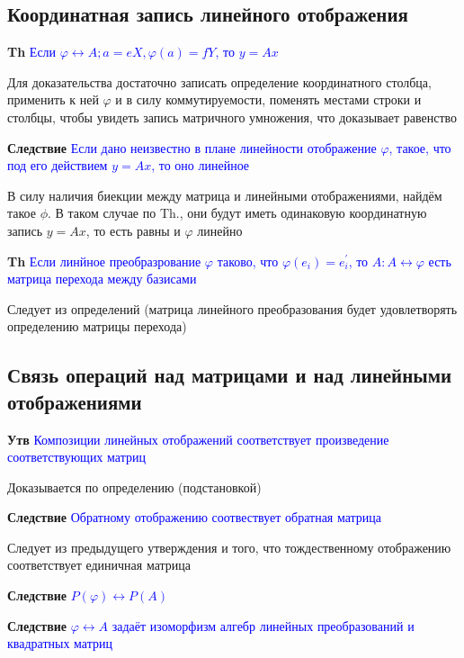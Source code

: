 \documentclass[a4paper, 14pt]{article}
\begin{document}
      \subsection{Координатная запись линейного отображения}

    \textbf{Th} \textcolor{blue}{Если $\varphi \leftrightarrow A; a = eX, \varphi(a) = fY$, то $y = Ax$}

    Для доказательства достаточно записать определение координатного столбца, применить к ней $\varphi$ и в силу
    коммутируемости, поменять местами строки и столбцы, чтобы увидеть запись матричного умножения, что доказывает
    равенство

    \textbf{Следствие} \textcolor{blue}{Если дано неизвестно в плане линейности отображение $\varphi$, такое, что под
    его действием $y = Ax$, то оно линейное}

    В силу наличия биекции между матрица и линейными отображениями, найдём такое $\phi$.
    В таком случае по Th., они будут иметь одинаковую координатную запись $y = Ax$, то есть равны и $\varphi$ линейно

    \textbf{Th} \textcolor{blue}{Если линйное преобразрование $\varphi$ таково, что $\varphi(e_i) = e_i^{'}$, то
        $A: A \leftrightarrow \varphi$ есть матрица перехода между базисами}

    Следует из определений (матрица линейного преобразования будет удовлетворять определению матрицы перехода)

    \subsection{Связь операций над матрицами и над линейными отображениями}

    \textbf{Утв} \textcolor{blue}{Композиции линейных отображений соответствует произведение соответствующих матриц}

    Доказывается по определению (подстановкой)

    \textbf{Следствие} \textcolor{blue}{Обратному отображению соотвествует обратная матрица}

    Следует из предыдущего утверждения и того, что тождественному отображению соответствует единичная матрица

    \textbf{Следствие} \textcolor{blue}{$P(\varphi) \leftrightarrow P(A)$}

    \textbf{Следствие} \textcolor{blue}{$\varphi \leftrightarrow A$ задаёт изоморфизм алгебр линейных преобразований
    и квадратных матриц}
\end{document}
